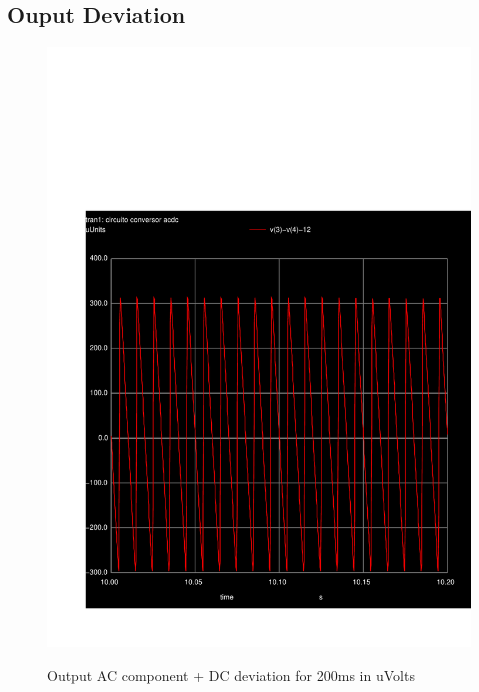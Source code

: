 \subsection{Ouput Deviation}
\begin{figure}[ht] \centering
  \caption{Output AC component + DC deviation for 200ms in uVolts}
  \includegraphics[width=0.8\linewidth]{../sim/deviation.pdf}
  \label{fig:deviation}
\end{figure}

\newpage








